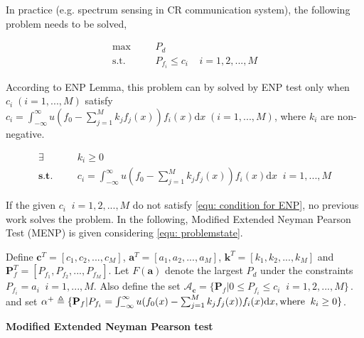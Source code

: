 \documentclass[12pt,journal,a4paper,twoside,onecolumn,draft]{IEEEtran}
\begin{document}
\begin{spacing}{2.5}
In practice (e.g. spectrum sensing in CR communication system), the following problem needs to be solved,

      \begin{equation}
      \label{equ: problemstate}
      \begin{split}
      \max\;\;\;\;\;\;&P_d\\
      \text{s.t.}\;\;\;\;\;\;&P_{f_i} \leq c_i\;\;\;\;i = 1, 2, ..., M
      \end{split}
      \end{equation}

According to ENP Lemma, this problem can by solved by ENP test only when  $c_i \;(i = 1, ..., M)$ satisfy $c_i = \int_{-\infty}^{\infty}u(f_0 - \sum_{j=1}^{M}k_jf_j(x))f_i(x)\mathrm{d}x \;(i=1, ..., M)$, where $k_i$ are non-negative.

\begin{equation}
\label{equ: condition for ENP}
\begin{split}
\exists\;\;\;\;\;\;\;&k_i \geq 0\\
\textbf{s.t.}\;\;\;\;\;\;&c_i = \int_{-\infty}^{\infty}u(f_0 - \sum_{j=1}^{M}k_jf_j(x))f_i(x)\mathrm{d}x \;\;i = 1, ..., M
\end{split}
\end{equation}

If the given $c_i\;\;i = 1, 2, ..., M$ do not satisfy \eqref{equ: condition for ENP}, no previous work solves the problem. In the following, Modified Extended Neyman Pearson Test (MENP) is given considering \eqref{equ: problemstate}.

\def \JUDGEMENT{u(f_0(x) - \sum_{j=1}^{M}k_j f_j(x))}

Define $\mathbf{c}^T = [c_1, c_2, ..., c_M]$, $\mathbf{a}^T=[a_1, a_2, ..., a_M]$, $\mathbf{k}^T = [k_1, k_2, ..., k_M]$ and  $\mathbf{P}_f^T = [P_{f_1}, P_{f_2}, ..., P_{f_M}]$. Let
$F(\mathbf{a})$ denote the largest $P_d$ under the constraints $P_{f_i} = a_i\;\;i = 1, ..., M$.
Also define the set $\mathcal{A}_\mathbf{c} = \{
  \mathbf{P}_f | 0 \leq P_{f_i} \leq c_i
  \;\;i=1, 2, ..., M\}\,.
$ and set $\alpha^+ \triangleq \{\mathbf{P}_f | P_{f_i} = \int_{-\infty}^{\infty} \JUDGEMENT f_i(x) \mathrm{d}x, \text{where\;\;} k_i \geq 0\}$.

\noindent \textbf{Modified Extended Neyman Pearson test}


\end{spacing}
\end{document}
